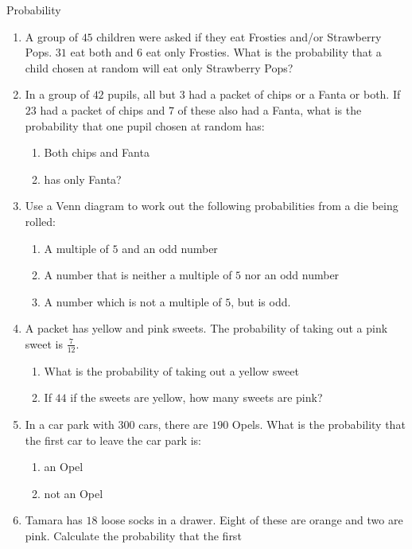\begin{eocexercises}{Probability}\noindent
  \begin{enumerate}[itemsep=5pt, label=\textbf{\arabic*}. ]
  \item A group of $45$ children were asked if they eat Frosties and/or
    Strawberry Pops. $31$ eat both and $6$ eat only Frosties. What is the
    probability that a child chosen at random will eat only Strawberry
    Pops?
  \item In a group of $42$ pupils, all but $3$ had a packet of chips
    or a Fanta or both. If $23$ had a packet of chips and $7$ of these
    also had a Fanta, what is the probability that one pupil chosen at
    random has:
    \begin{enumerate}
    \item Both chips and Fanta
    \item has only Fanta?
    \end{enumerate}
  \item Use a Venn diagram to work out the following probabilities
    from a die being rolled:
    \begin{enumerate}
    \item A multiple of $5$ and an odd number
    \item A number that is neither a multiple of $5$ nor an odd
      number
    \item A number which is not a multiple of $5$, but is odd.
    \end{enumerate}
  \item A packet has yellow and pink sweets. The probability of taking
    out a pink sweet is $\frac{7}{12}$.
    \begin{enumerate}
    \item What is the probability of taking out a yellow sweet
    \item If $44$ if the sweets are yellow, how many sweets are pink?
    \end{enumerate}
  \item In a car park with $300$ cars, there are $190$ Opels. What is the
    probability that the first car to leave the car park is:
    \begin{enumerate}
    \item an Opel
    \item not an Opel
    \end{enumerate}
  \item Tamara has $18$ loose socks in a drawer. Eight of these are
    orange and two are pink. Calculate the probability that the first

\end{enumerate}
\end{eocexercises}
